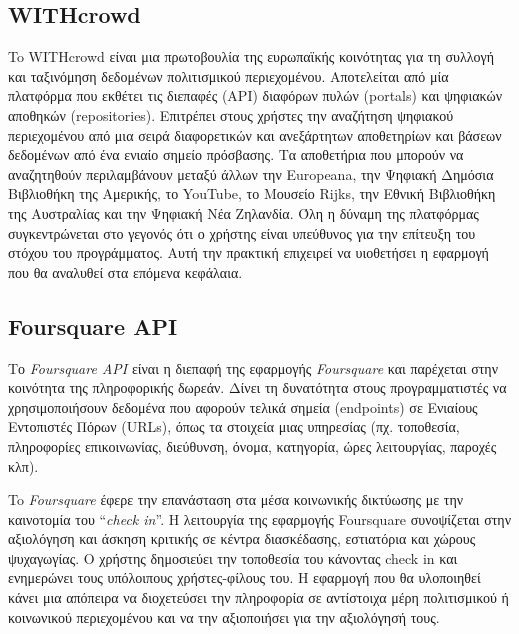 \subsection{WITHcrowd}
To WITHcrowd\cite{[WIT+18]} είναι μια πρωτοβουλία της ευρωπαϊκής κοινότητας για τη συλλογή και ταξινόμηση δεδομένων πολιτισμικού περιεχομένου. Αποτελείται από μία πλατφόρμα που εκθέτει τις διεπαφές (ΑΡΙ) διαφόρων πυλών (portals) και ψηφιακών αποθηκών (repositories). Eπιτρέπει στους χρήστες την αναζήτηση ψηφιακού περιεχομένου από μια σειρά διαφορετικών και ανεξάρτητων αποθετηρίων και βάσεων δεδομένων από ένα ενιαίο σημείο πρόσβασης. Τα αποθετήρια που μπορούν να αναζητηθούν περιλαμβάνουν μεταξύ άλλων την Europeana, την Ψηφιακή Δημόσια Βιβλιοθήκη της Αμερικής, το YouTube, το Μουσείο Rijks, την Εθνική Βιβλιοθήκη της Αυστραλίας και την Ψηφιακή Νέα Ζηλανδία. Όλη η δύναμη της πλατφόρμας συγκεντρώνεται στο γεγονός ότι ο χρήστης είναι υπεύθυνος για την επίτευξη του στόχου του προγράμματος. Αυτή την πρακτική επιχειρεί να υιοθετήσει η εφαρμογή που θα αναλυθεί στα επόμενα κεφάλαια. 

\subsection{Foursquare API}
Το \textit{Foursquare API}\cite{[4SQ+18]} είναι η διεπαφή της εφαρμογής \textit{Foursquare} και παρέχεται στην κοινότητα της πληροφορικής δωρεάν. Δίνει τη δυνατότητα στους προγραμματιστές να χρησιμοποιήσουν δεδομένα που αφορούν τελικά σημεία (endpoints) σε Ενιαίους Εντοπιστές Πόρων (URLs), όπως τα στοιχεία μιας υπηρεσίας (πχ. τοποθεσία, πληροφορίες επικοινωνίας, διεύθυνση, όνομα, κατηγορία, ώρες λειτουργίας, παροχές κλπ).

To \textit{Foursquare} έφερε την επανάσταση στα μέσα κοινωνικής δικτύωσης με την καινοτομία του ``\textit{check in}''.  Η λειτουργία της εφαρμογής Foursquare συνοψίζεται στην αξιολόγηση και άσκηση κριτικής σε κέντρα διασκέδασης, εστιατόρια και χώρους ψυχαγωγίας. Ο χρήστης δημοσιεύει την τοποθεσία του κάνοντας check in και ενημερώνει τους υπόλοιπους χρήστες-φίλους του. Η εφαρμογή που θα υλοποιηθεί κάνει μια απόπειρα να διοχετεύσει την πληροφορία σε αντίστοιχα μέρη πολιτισμικού ή κοινωνικού περιεχομένου και να την αξιοποιήσει για την αξιολόγησή τους.


